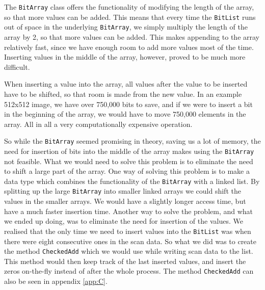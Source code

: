 The \lstinline|BitArray| class offers the functionality of modifying the length of the array, so that more values can be added.
This means that every time the \lstinline|BitList| runs out of space in the underlying \lstinline|BitArray|, we simply multiply the length of the array by 2, so that more values can be added.
This makes appending to the array relatively fast, since we have enough room to add more values most of the time.
Inserting values in the middle of the array, however, proved to be much more difficult.

When inserting a value into the array, all values after the value to be inserted have to be shifted, so that room is made from the new value.
In an example 512x512 image, we have over 750,000 bits to save, and if we were to insert a bit in the beginning of the array, we would have to move 750,000 elements in the array.
All in all a very computationally expensive operation.

So while the \lstinline|BitArray| seemed promising in theory, saving us a lot of memory, the need for insertion of bits into the middle of the array makes using the \lstinline|BitArray| not feasible.
What we would need to solve this problem is to eliminate the need to shift a large part of the array. 
One way of solving this problem is to make a data type which combines the functionality of the \lstinline|BitArray| with a linked list. 
By splitting up the large \lstinline|BitArray| into smaller linked arrays we could shift the values in the smaller arrays. 
We would have a slightly longer access time, but have a much faster insertion time. 
Another way to solve the problem, and what we ended up doing, was to eliminate the need for insertion of the values. 
We realised that the only time we need to insert values into the \lstinline|BitList| was when there were eight consecutive ones in the scan data. 
So what we did was to create the method \lstinline|CheckedAdd| which we would use while writing scan data to the list. 
This method would then keep track of the last inserted values, and insert the zeros on-the-fly instead of after the whole process. 
The method \lstinline|CheckedAdd| can also be seen in appendix \ref{app:C}.